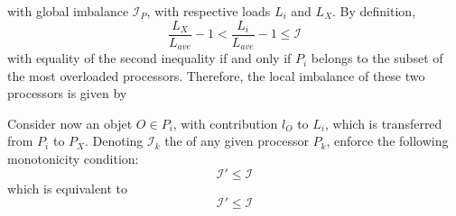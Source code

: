 with global imbalance
$\mathcal{I}_P$, with respective loads $L_i$ and $L_X$.
By definition, 
\[
\frac{L_X}{L_{ave}} - 1 < \frac{L_i}{L_{ave}} - 1 \le \mathcal{I}
\]
with equality of the second inequality if and only if $P_i$ belongs to
the subset of the most overloaded processors. Therefore, the local
imbalance of these two processors is given by

Consider now an objet $O\in P_i$, with contribution $l_O$ to $L_i$,
which is transferred from $P_i$ to $P_X$. Denoting $\mathcal{I}_k$ the
 of any given processor $P_k$, 
enforce the following monotonicity condition:
\[
\mathcal{I}' \le \mathcal{I}
\]
which is equivalent to
\[
\mathcal{I}' \le \mathcal{I}
\]
